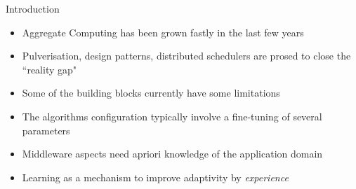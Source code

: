 \begin{frame}{ \playfairblack Introduction }
  \begin{card}
    \begin{itemize}
      \item[\success{\faThumbsUp}] Aggregate Computing has been grown fastly in the last few years
      \item[\success{\faThumbsUp}] Pulverisation, design patterns, distributed schedulers are prosed to close the ``reality gap"
      \item[\failure{\faThumbsDown}] Some of the building blocks currently have some limitations
      \item[\failure{\faThumbsDown}] The algorithms configuration typically involve a fine-tuning of several parameters
      \item[\failure{\faThumbsDown}] Middleware aspects need apriori knowledge of the application domain
      \item[\highlightAlt{\faLightbulb}] Learning as a mechanism to improve adaptivity by  \emph{experience}
    \end{itemize}
  \end{card}
\end{frame}